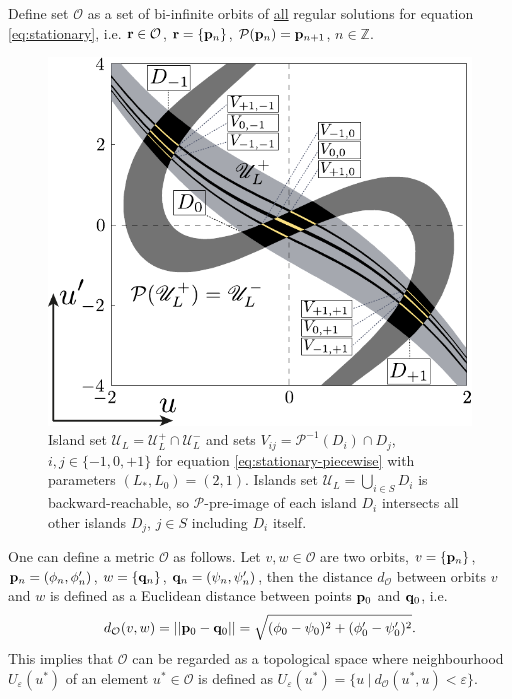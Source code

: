 \begin{definition}
	Define set $\mathcal{O}$ as a set of bi-infinite orbits of \underline{all} regular solutions for equation \eqref{eq:stationary}, i.e. $\vb{r} \in \mathcal{O}$, $\vb{r} = \{ \vb{p}_n \}$, $\mathcal{P}(\vb{p}_n) = \vb{p}_{n+1}$, $n \in \mathbb{Z}$.
\end{definition}

\begin{figure}[h]
\centering
	\includegraphics[scale = 1]{pic/v-strips for piecewise equation}
	\caption{
		Island set $\mathscr{U}_L = \mathscr{U}_L^+ \cap \mathscr{U}_L^-$ and sets $V_{ij} = \mathcal{P}^{-1}(D_i) \cap D_j$, $i, j \in \{ -1, 0, +1 \}$ for equation \eqref{eq:stationary-piecewise} with parameters $(L_*, L_0) = (2, 1)$.
		Islands set $\mathscr{U}_L = \bigcup_{i \in S} D_i$ is backward-reachable, so $\mathcal{P}$-pre-image of each island $D_i$ intersects all other islands $D_j$, $j \in S$ including $D_i$ itself.
	}
\label{fig:v-strips-piecewise}
\end{figure}

One can define a metric $\mathcal{O}$ as follows.
Let $v, w \in \mathcal{O}$ are two orbits, $v = \{ \vb{p}_n \}$, $\vb{p}_n = (\phi_n, \phi_n')$, $w = \{ \vb{q}_n \}$, $\vb{q}_n = (\psi_n, \psi_n')$, then the distance $d_{\mathcal{O}}$ between orbits $v$ and $w$ is defined as a Euclidean distance between points $\vb{p}_0$ and $\vb{q}_0$, i.e.
\begin{equation}
	d_{\mathcal{O}}(v, w) = ||\vb{p}_0 - \vb{q}_0 || = \sqrt{(\phi_0 - \psi_0)^2 + (\phi_0' - \psi_0')^2}.
\end{equation}
This implies that $\mathcal{O}$ can be regarded as a topological space where neighbourhood $U_{\varepsilon}(u^*)$ of an element $u^* \in \mathcal{O}$ is defined as $U_{\varepsilon}(u^*) = \{u \ | \ d_{\mathcal{O}}(u^*, u) < \varepsilon \}$.

